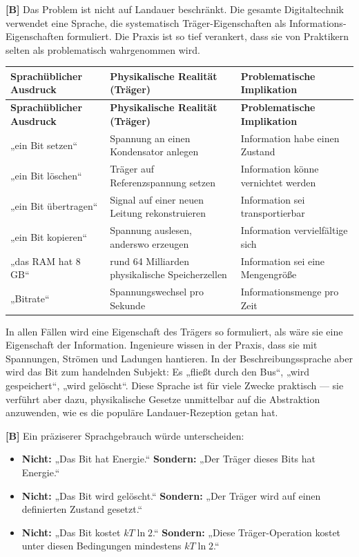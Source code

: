 \textbf{[B]} Das Problem ist nicht auf Landauer beschränkt. Die gesamte Digitaltechnik
verwendet eine Sprache, die systematisch Träger-Eigenschaften als
Informations-Eigenschaften formuliert. Die Praxis ist so tief verankert, dass sie
von Praktikern selten als problematisch wahrgenommen wird.

\begin{center}
\small
\begin{longtable}{@{}p{}p{}p{}@{}}
\toprule
\textbf{Sprachüblicher Ausdruck} & \textbf{Physikalische Realität (Träger)} & \textbf{Problematische Implikation} \\
\midrule
\endfirsthead
\toprule
\textbf{Sprachüblicher Ausdruck} & \textbf{Physikalische Realität (Träger)} & \textbf{Problematische Implikation} \\
\midrule
\endhead
„ein Bit setzen“ & Spannung an einen Kondensator anlegen & Information habe einen Zustand \\
„ein Bit löschen“ & Träger auf Referenzspannung setzen & Information könne vernichtet werden \\
„ein Bit übertragen“ & Signal auf einer neuen Leitung rekonstruieren & Information sei transportierbar \\
„ein Bit kopieren“ & Spannung auslesen, anderswo erzeugen & Information vervielfältige sich \\
„das RAM hat 8\,GB“ & rund 64 Milliarden physikalische Speicherzellen & Information sei eine Mengengröße \\
„Bitrate“ & Spannungswechsel pro Sekunde & Informationsmenge pro Zeit \\
\bottomrule
\end{longtable}
\end{center}

In allen Fällen wird eine Eigenschaft des Trägers so formuliert, als wäre sie eine
Eigenschaft der Information. Ingenieure wissen in der Praxis, dass sie mit
Spannungen, Strömen und Ladungen hantieren. In der Beschreibungssprache aber wird
das Bit zum handelnden Subjekt: Es „fließt durch den Bus“, „wird gespeichert“,
„wird gelöscht“. Diese Sprache ist für viele Zwecke praktisch --- sie verführt aber
dazu, physikalische Gesetze unmittelbar auf die Abstraktion anzuwenden, wie es die
populäre Landauer-Rezeption getan hat.

\textbf{[B]} Ein präziserer Sprachgebrauch würde unterscheiden:

\begin{itemize}[leftmargin=1.4em,itemsep=0.25em]
  \item \textbf{Nicht:} „Das Bit hat Energie.“ \quad
        \textbf{Sondern:} „Der Träger dieses Bits hat Energie.“
  \item \textbf{Nicht:} „Das Bit wird gelöscht.“ \quad
        \textbf{Sondern:} „Der Träger wird auf einen definierten Zustand gesetzt.“
  \item \textbf{Nicht:} „Das Bit kostet $kT\ln 2$.“ \quad
        \textbf{Sondern:} „Diese Träger-Operation kostet unter diesen Bedingungen
        mindestens $kT\ln 2$.“
\end{itemize}

